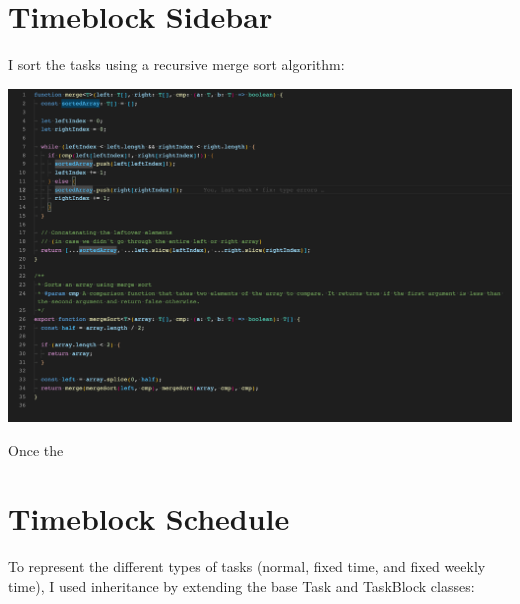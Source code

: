 \documentclass[notitlepage, 12pt]{report}
\begin{document}
\section*{Timeblock Sidebar}

I sort the tasks using a recursive merge sort algorithm:

\includegraphics[width=1\textwidth]{merge-sort.png}

Once the

\section*{Timeblock Schedule}

To represent the different types of tasks (normal, fixed time, and fixed weekly time), I used inheritance by extending the base Task and TaskBlock classes:
\end{document}
